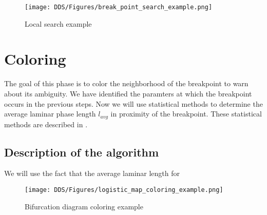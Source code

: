 \begin{figure}[!h]
    \centering
    \texttt{[image: DDS/Figures/break\_point\_search\_example.png]}
    \caption{Local search example}
    \label{fig:break_point_search_example}
\end{figure}


\section{Coloring}
The goal of this phase is to color the neighborhood of the breakpoint to warn about its ambiguity.
We have identified the paramters at which the breakpoint occurs in the previous steps.
Now we will use statistical methods to determine the average laminar phase length $l_{avg}$ in proximity of the breakpoint.
These statistical methods are described in \cite{Elaskar2022}.

\subsection{Description of the algorithm}
We will use the fact that the average laminar length for 

\begin{figure}[!h]
    \centering
    \texttt{[image: DDS/Figures/logistic\_map\_coloring\_example.png]}
    \caption{Bifurcation diagram coloring example}
    \label{fig:coloring_example}
\end{figure}

\endinput